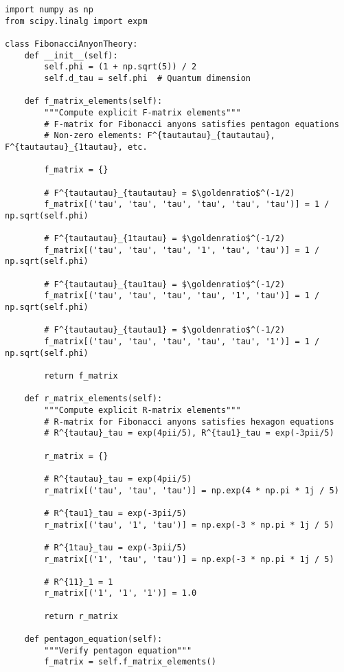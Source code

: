 \documentclass[11pt]{article}
\theoremstyle{definition}
\newcommand{\goldenratio}{\phi}
\begin{document}
\begin{verbatim}
import numpy as np
from scipy.linalg import expm

class FibonacciAnyonTheory:
    def __init__(self):
        self.phi = (1 + np.sqrt(5)) / 2
        self.d_tau = self.phi  # Quantum dimension
        
    def f_matrix_elements(self):
        """Compute explicit F-matrix elements"""
        # F-matrix for Fibonacci anyons satisfies pentagon equations
        # Non-zero elements: F^{tautautau}_{tautautau}, F^{tautautau}_{1tautau}, etc.
        
        f_matrix = {}
        
        # F^{tautautau}_{tautautau} = $\goldenratio$^(-1/2)
        f_matrix[('tau', 'tau', 'tau', 'tau', 'tau', 'tau')] = 1 / np.sqrt(self.phi)
        
        # F^{tautautau}_{1tautau} = $\goldenratio$^(-1/2)
        f_matrix[('tau', 'tau', 'tau', '1', 'tau', 'tau')] = 1 / np.sqrt(self.phi)
        
        # F^{tautautau}_{tau1tau} = $\goldenratio$^(-1/2)
        f_matrix[('tau', 'tau', 'tau', 'tau', '1', 'tau')] = 1 / np.sqrt(self.phi)
        
        # F^{tautautau}_{tautau1} = $\goldenratio$^(-1/2)
        f_matrix[('tau', 'tau', 'tau', 'tau', 'tau', '1')] = 1 / np.sqrt(self.phi)
        
        return f_matrix
    
    def r_matrix_elements(self):
        """Compute explicit R-matrix elements"""
        # R-matrix for Fibonacci anyons satisfies hexagon equations
        # R^{tautau}_tau = exp(4pii/5), R^{tau1}_tau = exp(-3pii/5)
        
        r_matrix = {}
        
        # R^{tautau}_tau = exp(4pii/5)
        r_matrix[('tau', 'tau', 'tau')] = np.exp(4 * np.pi * 1j / 5)
        
        # R^{tau1}_tau = exp(-3pii/5)
        r_matrix[('tau', '1', 'tau')] = np.exp(-3 * np.pi * 1j / 5)
        
        # R^{1tau}_tau = exp(-3pii/5)
        r_matrix[('1', 'tau', 'tau')] = np.exp(-3 * np.pi * 1j / 5)
        
        # R^{11}_1 = 1
        r_matrix[('1', '1', '1')] = 1.0
        
        return r_matrix
    
    def pentagon_equation(self):
        """Verify pentagon equation"""
        f_matrix = self.f_matrix_elements()
        

\end{verbatim}
\end{document}
